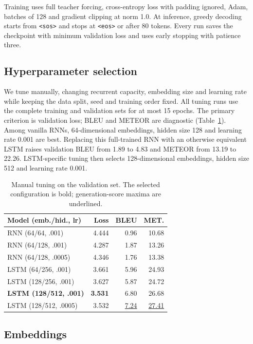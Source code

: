 \documentclass[sigconf,nonacm]{acmart}
\begin{document}
Training uses full teacher forcing, cross-entropy loss with padding ignored,
Adam, batches of 128 and gradient clipping at norm 1.0. At inference, greedy
decoding starts from \texttt{<sos>} and stops at \texttt{<eos>} or after 80
tokens. Every run saves the checkpoint with minimum validation loss and uses
early stopping with patience three.

\subsection{Hyperparameter selection}

We tune manually, changing recurrent capacity, embedding size and learning rate
while keeping the data split, seed and training order fixed. All tuning runs use
the complete training and validation sets for at most 15 epochs. The primary
criterion is validation loss; BLEU and METEOR are diagnostic
(Table~\ref{tab:tuning}). Among vanilla RNNs, 64-dimensional embeddings, hidden
size 128 and learning rate 0.001 are best. Replacing this full-trained RNN with
an otherwise equivalent LSTM raises validation BLEU from 1.89 to 4.83 and
METEOR from 13.19 to 22.26. LSTM-specific tuning then selects
128-dimensional embeddings, hidden size 512 and learning rate 0.001.

\begin{table}[h]
\caption{Manual tuning on the validation set. The selected configuration is
bold; generation-score maxima are underlined.}
\label{tab:tuning}
\scriptsize
\setlength{\tabcolsep}{3pt}
\begin{tabular}{lrrr}
\toprule
\textbf{Model (emb./hid., lr)} &
\textbf{Loss} & \textbf{BLEU} & \textbf{MET.} \\
\midrule
RNN (64/64, .001)       & 4.444 & 0.96 & 10.68 \\
RNN (64/128, .001)      & 4.287 & 1.87 & 13.26 \\
RNN (64/128, .0005)     & 4.346 & 1.76 & 13.38 \\
LSTM (64/256, .001)     & 3.661 & 5.96 & 24.93 \\
LSTM (128/256, .001)    & 3.627 & 5.87 & 24.72 \\
\textbf{LSTM (128/512, .001)} &
\textbf{3.531} & 6.80 & 26.68 \\
LSTM (128/512, .0005)   & 3.532 & \underline{7.24} & \underline{27.41} \\
\bottomrule
\end{tabular}
\end{table}

\subsection{Embeddings}
\end{document}
